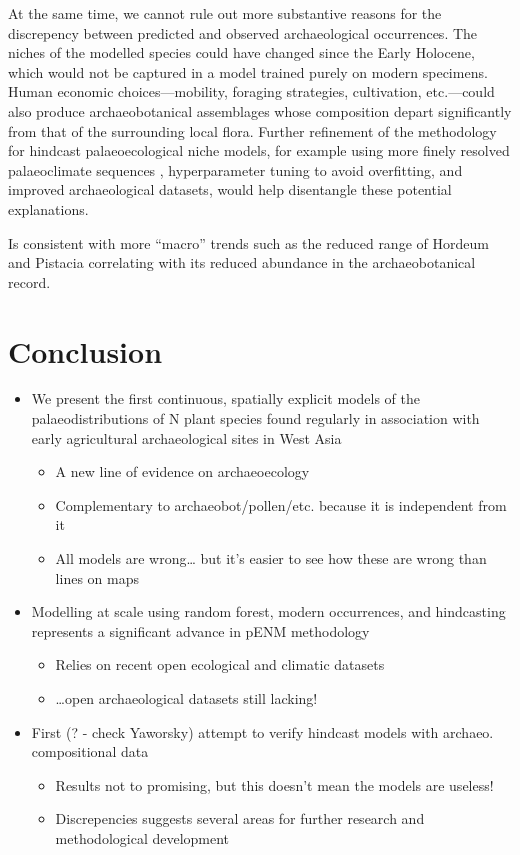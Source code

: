 \documentclass[
  authoryear,
  preprint]{elsarticle}
\providecommand{\tightlist}{%
  \setlength{\itemsep}{0pt}\setlength{\parskip}{0pt}}\usepackage{longtable,booktabs,array}
\begin{document}
At the same time, we cannot rule out more substantive reasons for the
discrepency between predicted and observed archaeological occurrences.
The niches of the modelled species could have changed since the Early
Holocene, which would not be captured in a model trained purely on
modern specimens. Human economic choices---mobility, foraging
strategies, cultivation, etc.---could also produce archaeobotanical
assemblages whose composition depart significantly from that of the
surrounding local flora. Further refinement of the methodology for
hindcast palaeoecological niche models, for example using more finely
resolved palaeoclimate sequences \citep[e.g.][]{KargerEtAl2023},
hyperparameter tuning to avoid overfitting, and improved archaeological
datasets, would help disentangle these potential explanations.

Is consistent with more ``macro'' trends such as the reduced range of
Hordeum and Pistacia correlating with its reduced abundance in the
archaeobotanical record.

\section{Conclusion}\label{conclusion}

\begin{itemize}
\tightlist
\item
  We present the first continuous, spatially explicit models of the
  palaeodistributions of N plant species found regularly in association
  with early agricultural archaeological sites in West Asia

  \begin{itemize}
  \tightlist
  \item
    A new line of evidence on archaeoecology
  \item
    Complementary to archaeobot/pollen/etc. because it is independent
    from it
  \item
    All models are wrong\ldots{} but it's easier to see how these are
    wrong than lines on maps
  \end{itemize}
\item
  Modelling at scale using random forest, modern occurrences, and
  hindcasting represents a significant advance in pENM methodology

  \begin{itemize}
  \tightlist
  \item
    Relies on recent open ecological and climatic datasets
  \item
    \ldots open archaeological datasets still lacking!
  \end{itemize}
\item
  First (? - check Yaworsky) attempt to verify hindcast models with
  archaeo. compositional data

  \begin{itemize}
  \tightlist
  \item
    Results not to promising, but this doesn't mean the models are
    useless!
  \item
    Discrepencies suggests several areas for further research and
    methodological development
  \end{itemize}
\end{itemize}


\renewcommand\refname{References}
  
\end{document}
